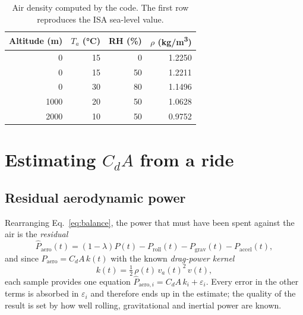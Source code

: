 \documentclass[11pt,a4paper]{article}
\newcommand{\CdA}{C_{\!d}A}
\begin{document}
\begin{table}[H]
\centering\small
\begin{tabular}{@{}rrrr@{}}
\toprule
Altitude (m) & \(T_a\) (\si{\degreeCelsius}) & RH (\%) & \(\rho\) (\si{kg/m^3}) \\
\midrule
0 & 15 & 0 & 1.2250 \\
0 & 15 & 50 & 1.2211 \\
0 & 30 & 80 & 1.1496 \\
1000 & 20 & 50 & 1.0628 \\
2000 & 10 & 50 & 0.9752 \\
\bottomrule
\end{tabular}
\caption{Air density computed by the code. The first row reproduces the ISA sea-level value.}\label{tab:rho}
\end{table}

\section{Estimating \(\CdA\) from a ride}
\label{sec:estimator}

\subsection{Residual aerodynamic power}
Rearranging Eq.~\eqref{eq:balance}, the power that must have been spent against the air is the \emph{residual}
\begin{equation}
 \hat P_{\mathrm{aero}}(t) = (1-\lambda)P(t) - P_{\mathrm{roll}}(t) - P_{\mathrm{grav}}(t) - P_{\mathrm{accel}}(t),
\end{equation}
and since \(P_{\mathrm{aero}}=\CdA\,k(t)\) with the known \emph{drag-power kernel}
\begin{equation}
 k(t)=\tfrac12\,\rho(t)\,v_a(t)^2\,v(t),
 \label{eq:kernel}
\end{equation}
each sample provides one equation \(\hat P_{\mathrm{aero},i}=\CdA\,k_i+\varepsilon_i\). Every error in the other terms is absorbed in \(\varepsilon_i\) and therefore ends up in the estimate; the quality of the result is set by how well rolling, gravitational and inertial power are known.
\end{document}
